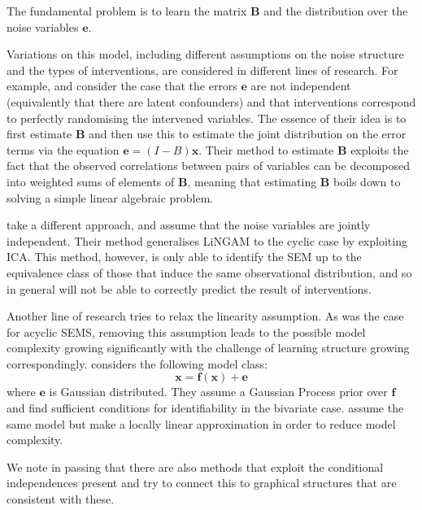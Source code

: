 The fundamental problem is to learn the matrix $\mathbf{B}$ and the distribution over the noise variables $\mathbf{e}$.


Variations on this model, including different assumptions on the noise structure and the types of interventions, are considered in different lines of research. 
For example, \cite{hyttinen2010causal} \cite{hyttinen2012learning} \cite{hyttinen2013discovering} and \cite{scheines2010combining} consider the case that the errors $\mathbf{e}$ are not independent (equivalently that there are latent confounders) and that interventions correspond to perfectly randomising the intervened variables. 
The essence of their idea is to first estimate $\mathbf{B}$ and then use this to estimate the joint distribution on the error terms via the equation $\mathbf{e} = (I-B)\mathbf{x}$. 
Their method to estimate $\mathbf{B}$ exploits the fact that the observed correlations between pairs of variables can be decomposed into weighted sums of elements of $\mathbf{B}$, meaning that estimating $\mathbf{B}$ boils down to solving a simple linear algebraic problem.


\cite{lacerda2012discovering} take a different approach, and assume that the noise variables are jointly independent. 
Their method generalises LiNGAM \cite{shimizu2006linear} to the cyclic case by exploiting ICA. 
This method, however, is only able to identify the SEM up to the equivalence class of those that induce the same observational distribution, and so in general will not be able to correctly predict the result of interventions.

Another line of research tries to relax the linearity assumption. 
As was the case for acyclic SEMS, removing this assumption leads to the possible model complexity growing significantly with the challenge of learning structure growing correspondingly. \cite{mooij2011causal} considers the following model class:
\[\mathbf{x} = \mathbf{f}(\mathbf{x}) + \mathbf{e}\] 
where $\mathbf{e}$ is Gaussian distributed. 
They assume a Gaussian Process prior over $\mathbf{f}$ and find sufficient conditions for identifiability in the bivariate case. \cite{mooij2013cyclic} assume the same model but make a locally linear approximation in order to reduce model complexity.


We note in passing that there are also methods \cite{richardson1996automated} \cite{richardson1996discovery} that exploit the conditional independences present and try to connect this to graphical structures that are consistent with these.



